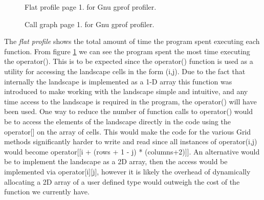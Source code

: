 \begin{figure}
\centering
{}
\caption{Flat profile page 1. for Gnu gprof profiler.}
\label{fig:flatp}
\end{figure}

\begin{figure}
\centering
{}
\caption{Call graph page 1. for Gnu gprof profiler.}
\label{fig:callg}
\end{figure}

The \textit{flat profile} shows the total amount of time the program spent executing each function. From figure \ref{fig:flatp} we can see the program spent the most time executing the operator(). This is to be expected since the operator() function is used as a utility for accessing the landscape cells in the form (i,j). Due to the fact that internally the landscape is implemented as a 1-D array this function was introduced to make working with the landscape simple and intuitive, and any time access to the landscape is required in the program, the operator() will have been used. One way to reduce the number of function calls to operator() would be to access the elements of the landscape directly in the code using the operator[] on the array of cells. This would make the code for the various Grid methods significantly harder to write and read since all instances of operator(i,j) would become operator[[i + (rows + 1 - j) * (columns+2)]]. An alternative would be to implement the landscape as a 2D array, then the access would be implemented via operator[i][j], however it is likely the overhead of dynamically allocating a 2D array of a user defined type would outweigh the cost of the function we currently have. \\


